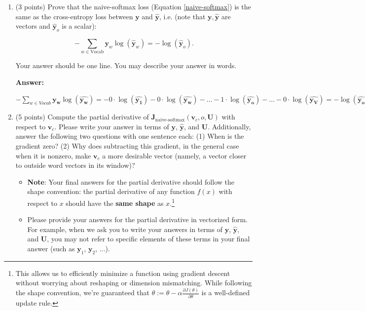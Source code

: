 \documentclass{article}
\newenvironment{answer}{
        {\bf Answer:} \sf \begingroup\color{red}
    }{\endgroup}%
\begin{document}
    \clearpage
    \begin{enumerate}
        [label=(\alph*)]
        \item (3 points)
        Prove that the naive-softmax loss (Equation \ref{naive-softmax}) is the same as the cross-entropy loss between $\bm y$ and $\hat{\bm y}$, i.e. (note that $\bm y, \hat{\bm y}$ are vectors and $\hat{\bm y}_o$ is a scalar):

        \begin{equation}
            -\sum_{w \in \text{Vocab}} \bm y_w \log(\hat{\bm y}_w) = - \log (\hat{\bm y}_o).
        \end{equation}

        Your answer should be one line. You may describe your answer in words.
        \begin{shaded}
            \begin{answer}
                $ - \sum_{w \in Vocab} \bm{y_w} \log(\hat{\bm{y_w}}) =
                - 0 \cdot \log(\hat{\bm{y_1}}) - 0 \cdot \log(\hat{\bm{y_w}}) - \dots
                - 1 \cdot \log(\hat{\bm{y_o}}) - \dots - 0 \cdot \log(\hat{\bm{y_V}}) =
                - \log(\hat{\bm{y_o}}) $
            \end{answer}
        \end{shaded}

        \item (5 points) Compute the partial derivative of $\bm J_{\text{naive-softmax}}(\bm v_c, o, \bm U)$ with respect to $\bm v_c$. Please write your answer in terms of $\bm y$, $\hat{\bm y}$, and $\bm U$. Additionally, answer the following two questions with one sentence each: (1) When is the gradient zero? (2) Why does subtracting this gradient, in the general case when it is nonzero, make $\bm v_c$ a more desirable vector (namely, a vector closer to outside word vectors in its window)?

        \begin{itemize}
            \item \textbf{Note}: Your final answers for the partial derivative should follow the shape convention: the partial derivative of any function $f(x)$ with respect to $x$ should have the \textbf{same shape} as $x$.\footnote{This allows us to efficiently minimize a function using gradient descent without worrying about reshaping or dimension mismatching. While following the shape convention, we're guaranteed that $\theta:= \theta - \alpha\frac{\partial J(\theta)}{\partial \theta}$ is a well-defined update rule.}
            \item Please provide your answers for the partial derivative in vectorized form. For example, when we ask you to write your answers in terms of $\bm y$, $\hat{\bm y}$, and $\bm U$, you may not refer to specific elements of these terms in your final answer (such as $\bm y_1$, $\bm y_2$, $\dots$).
        \end{itemize}




\end{enumerate}
\end{document}

